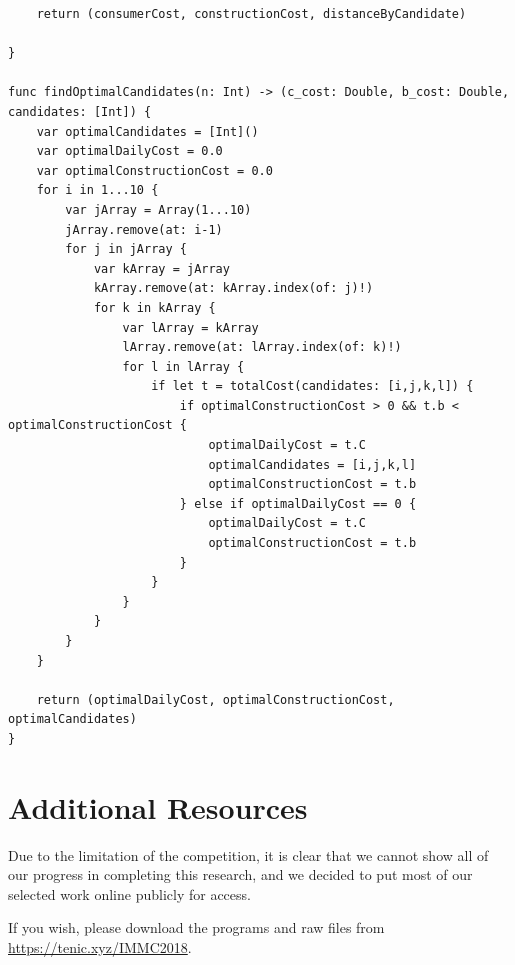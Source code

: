 \documentclass[10pt]{article}
\begin{document}
\begin{verbatim}
    return (consumerCost, constructionCost, distanceByCandidate)
    
}

func findOptimalCandidates(n: Int) -> (c_cost: Double, b_cost: Double, candidates: [Int]) {
    var optimalCandidates = [Int]()
    var optimalDailyCost = 0.0
    var optimalConstructionCost = 0.0
    for i in 1...10 {
        var jArray = Array(1...10)
        jArray.remove(at: i-1)
        for j in jArray {
            var kArray = jArray
            kArray.remove(at: kArray.index(of: j)!)
            for k in kArray {
                var lArray = kArray
                lArray.remove(at: lArray.index(of: k)!)
                for l in lArray {
                    if let t = totalCost(candidates: [i,j,k,l]) {
                        if optimalConstructionCost > 0 && t.b < optimalConstructionCost {
                            optimalDailyCost = t.C
                            optimalCandidates = [i,j,k,l]
                            optimalConstructionCost = t.b
                        } else if optimalDailyCost == 0 {
                            optimalDailyCost = t.C
                            optimalConstructionCost = t.b
                        }
                    }
                }
            }
        }
    }
    
    return (optimalDailyCost, optimalConstructionCost, optimalCandidates)
}
\end{verbatim}

\section{Additional Resources}
Due to the limitation of the competition, it is clear that we cannot show all of our progress in completing this research, and we decided to put most of our selected work online publicly for access.

If you wish, please download the programs and raw files from \href{http://tenic.xyz/IMMC2018}{https://tenic.xyz/IMMC2018}.
\end{document}
